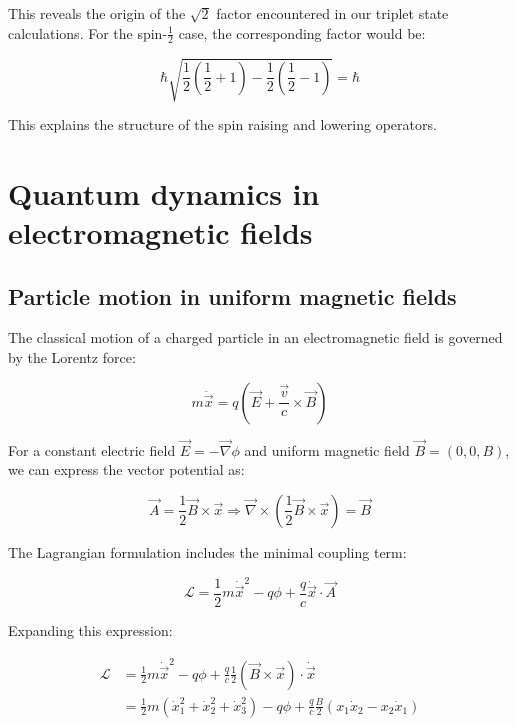 \documentclass[italian]{HKNdocument}
\begin{document}
This reveals the origin of the $\sqrt{2}$ factor encountered in our triplet state calculations. For the spin-$\frac{1}{2}$ case, the corresponding factor would be:

\begin{equation}
\hbar \sqrt{\frac{1}{2}(\frac{1}{2}+1)-\frac{1}{2}(\frac{1}{2}-1)}=\hbar \label{eq:11.77}
\end{equation}

This explains the structure of the spin raising and lowering operators.

\section{Quantum dynamics in electromagnetic fields}
\subsection{Particle motion in uniform magnetic fields}
The classical motion of a charged particle in an electromagnetic field is governed by the Lorentz force:

\begin{equation}
m \ddot{\vec{x}}=q(\vec{E}+\frac{\vec{v}}{c} \times \vec{B}) \label{eq:12.1}
\end{equation}

For a constant electric field $\vec{E}=-\vec{\nabla} \phi$ and uniform magnetic field $\vec{B}=(0,0,B)$, we can express the vector potential as:

\begin{equation}
\vec{A}=\frac{1}{2} \vec{B} \times \vec{x} \Rightarrow \vec{\nabla} \times(\frac{1}{2} \vec{B} \times \vec{x})=\vec{B} \label{eq:12.2}
\end{equation}

The Lagrangian formulation includes the minimal coupling term:

\begin{equation}
\mathcal{L}=\frac{1}{2} m \dot{\vec{x}}^{2}-q \phi+\frac{q}{c} \dot{\vec{x}} \cdot \vec{A} \label{eq:12.3}
\end{equation}

Expanding this expression:

\begin{align}
\mathcal{L} &= \frac{1}{2} m \dot{\vec{x}}^{2}-q \phi+\frac{q}{c} \frac{1}{2} (\vec{B} \times \vec{x}) \cdot \dot{\vec{x}}\\
&= \frac{1}{2} m(\dot{x}_{1}^{2}+\dot{x}_{2}^{2}+\dot{x}_{3}^{2})-q \phi+\frac{q}{c} \frac{B}{2}(x_{1} \dot{x}_{2}-x_{2}\dot{x}_{1}) \label{eq:12.4}
\end{align}
\end{document}
